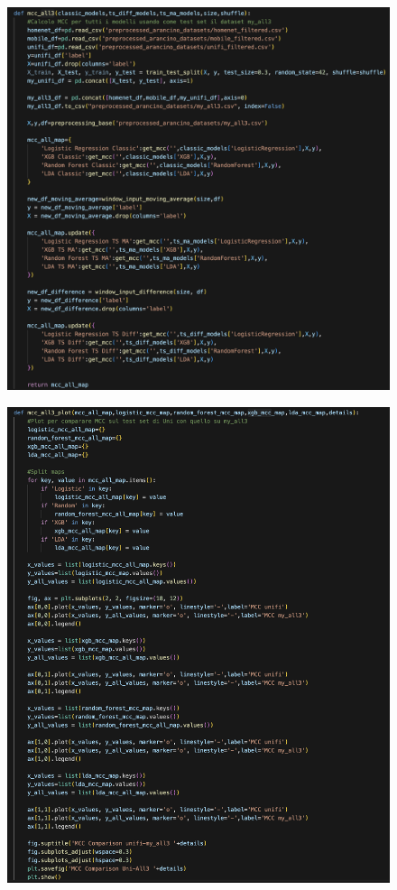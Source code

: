 \begin{appendices}
\begin{figure}[H]
    \centering
    \includegraphics[width=1\linewidth]{23.png}
    \label{fig:enter-label}
\end{figure}

\begin{figure}[H]
    \centering
    \includegraphics[width=1\linewidth]{24.png}
    \label{fig:enter-label}
\end{figure}


\end{appendices}
